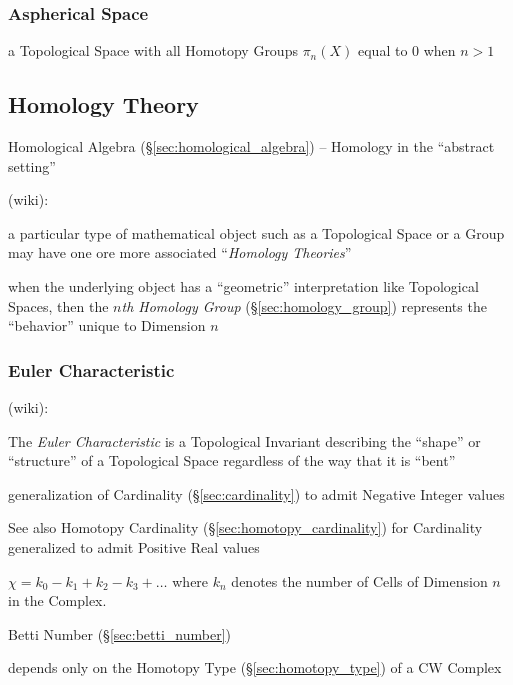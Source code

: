 \subsubsection{Aspherical Space}\label{sec:aspherical_space}

a Topological Space with all Homotopy Groups $\pi_n(X)$ equal to $0$ when $n >
1$



\subsection{Homology Theory}\label{sec:homology_theory}

\fist Homological Algebra (\S\ref{sec:homological_algebra}) -- Homology in the
``abstract setting''

(wiki):

a particular type of mathematical object such as a Topological Space or a
Group may have one ore more associated ``\emph{Homology Theories}''

when the underlying object has a ``geometric'' interpretation like Topological
Spaces, then the \emph{$n$th Homology Group} (\S\ref{sec:homology_group})
represents the ``behavior'' unique to Dimension $n$



\subsubsection{Euler Characteristic}\label{sec:euler_characteristic}

(wiki):

The \emph{Euler Characteristic} is a Topological Invariant describing the
``shape'' or ``structure'' of a Topological Space regardless of the way that it
is ``bent''

generalization of Cardinality (\S\ref{sec:cardinality}) to admit
Negative Integer values

\fist See also Homotopy Cardinality (\S\ref{sec:homotopy_cardinality})
for Cardinality generalized to admit Positive Real values

$\chi = k_0 - k_1 + k_2 - k_3 + \ldots$ where $k_n$ denotes the number
of Cells of Dimension $n$ in the Complex.

Betti Number (\S\ref{sec:betti_number})

depends only on the Homotopy Type (\S\ref{sec:homotopy_type}) of a
CW Complex \cite{hatcher02}

